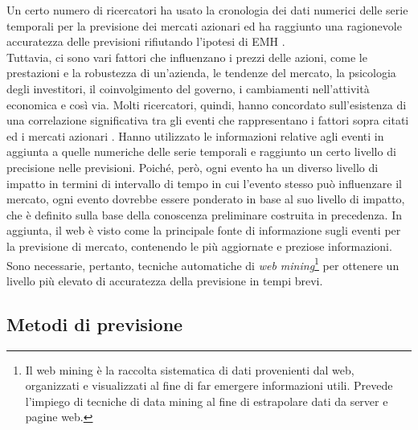 \documentclass[a4paper,12pt]{report}
\begin{document}
Un certo numero di ricercatori ha usato la cronologia dei dati numerici delle serie temporali per la previsione dei mercati azionari ed ha raggiunto una ragionevole accuratezza delle previsioni rifiutando l'ipotesi di EMH \cite{nn-eyden}\cite{emh0}.\\Tuttavia, ci sono vari fattori che influenzano i prezzi delle azioni, come le prestazioni e la robustezza di un'azienda, le tendenze del mercato, la psicologia degli investitori, il coinvolgimento del governo, i cambiamenti nell'attività economica e così via. Molti ricercatori, quindi, hanno concordato sull'esistenza di una correlazione significativa tra gli eventi che rappresentano i fattori sopra citati ed i mercati azionari \cite{news-nn}\cite{know-nn2}. Hanno utilizzato le informazioni relative agli eventi in aggiunta a quelle numeriche delle serie temporali e raggiunto un certo livello di precisione nelle previsioni. Poiché, però, ogni evento ha un diverso livello di impatto in termini di intervallo di tempo in cui l'evento stesso può influenzare il mercato, ogni evento dovrebbe essere ponderato in base al suo livello di impatto, che è definito sulla base della conoscenza preliminare costruita in precedenza. In aggiunta, il web è visto come la principale fonte di informazione sugli eventi per la previsione di mercato, contenendo le più aggiornate e preziose informazioni. Sono necessarie, pertanto, tecniche automatiche di \textit{web mining}\footnote{Il web mining è la raccolta sistematica di dati provenienti dal web, organizzati e visualizzati al fine di far emergere informazioni utili. Prevede l'impiego di tecniche di data mining al fine di estrapolare dati da server e pagine web.} per ottenere un livello più elevato di accuratezza della previsione in tempi brevi.

\subsection{Metodi di previsione}
\end{document}
